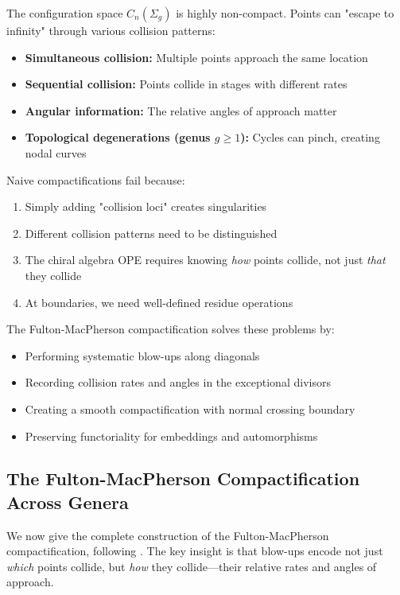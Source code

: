 \begin{remark}\label{rem:why-compactify}
The configuration space $C_n(\Sigma_g)$ is highly non-compact. Points can "escape to infinity" through various collision patterns:
\begin{itemize}
\item \textbf{Simultaneous collision:} Multiple points approach the same location
\item \textbf{Sequential collision:} Points collide in stages with different rates
\item \textbf{Angular information:} The relative angles of approach matter
\item \textbf{Topological degenerations (genus $g \geq 1$):} Cycles can pinch, creating nodal curves
\end{itemize}

Naive compactifications fail because:
\begin{enumerate}
\item Simply adding "collision loci" creates singularities
\item Different collision patterns need to be distinguished
\item The chiral algebra OPE requires knowing \emph{how} points collide, not just \emph{that} they collide
\item At boundaries, we need well-defined residue operations
\end{enumerate}

The Fulton-MacPherson compactification \cite{FM94} solves these problems by:
\begin{itemize}
\item Performing systematic blow-ups along diagonals
\item Recording collision rates and angles in the exceptional divisors  
\item Creating a smooth compactification with normal crossing boundary
\item Preserving functoriality for embeddings and automorphisms
\end{itemize}
\end{remark}

\subsection{The Fulton-MacPherson Compactification Across Genera}

We now give the complete construction of the Fulton-MacPherson compactification, following \cite{FM94, BD04}. The key insight is that blow-ups encode not just \emph{which} points collide, but \emph{how} they collide---their relative rates and angles of approach.

